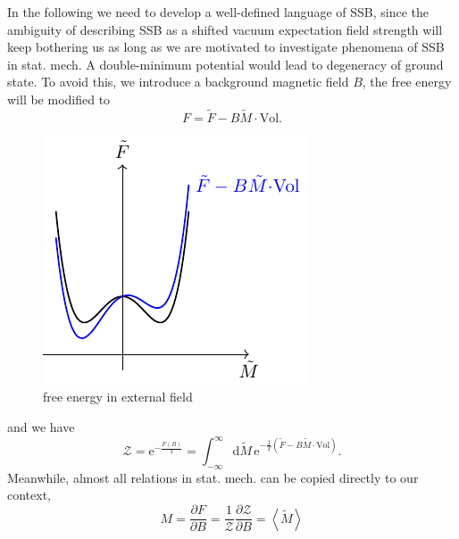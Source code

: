 In the following we need to develop a well-defined language of SSB, since the ambiguity of describing SSB as a shifted vacuum expectation field strength will keep bothering us as long as we are motivated to investigate phenomena of SSB in stat. mech.
A double-minimum potential would lead to degeneracy of ground state. To avoid this, we introduce a background magnetic field $B$, the free energy will be modified to
\begin{equation}
  F = \tilde{F} - B \tilde{M} \cdot \text{Vol}.
\end{equation}
\begin{figure}
    \centering
    \includegraphics{figures/free_energy_in_external_field.pdf}
    \caption{free energy in external field}
\end{figure}
and we have 
\begin{equation}
    \mathcal{Z} = \mathrm{e}^{- \frac{F\left( B \right)}{T}} = \int_{-\infty}^{\infty} \mathrm{d}\tilde{M} \, \mathrm{e}^{-\frac{1}{T} \left( \tilde{F} - B \tilde{M} \cdot \text{Vol} \right) } .
\end{equation}
Meanwhile, almost all relations in stat. mech. can be copied directly to our context,
\begin{equation}
    M = \frac{\partial F}{\partial B} = \frac{1}{\mathcal{Z}} \frac{\partial \mathcal{Z}}{\partial B} = \left< \tilde{M} \right> 
\end{equation}

